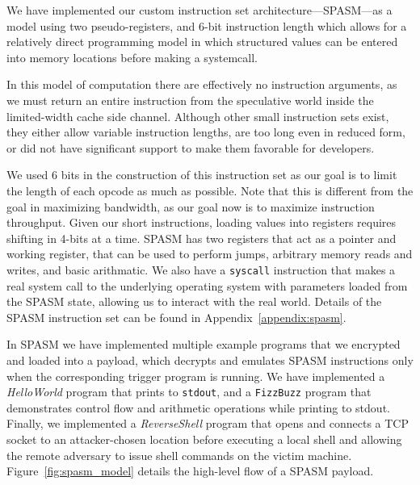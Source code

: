 We have implemented our custom instruction set architecture---SPASM---as a model
using two pseudo-registers, and
6-bit instruction length which allows for a relatively direct programming model
in which structured values can be entered into memory locations before making
a systemcall.


%

In this model of computation there are effectively no instruction arguments, as we must
return an entire instruction from the speculative world inside the limited-width
cache side channel. Although other small
instruction sets exist, they either allow variable instruction
lengths, are too long even in reduced form, or did not have significant support
to make them favorable for developers.

We used 6 bits in the construction of this instruction set as our
goal is to limit the length of each opcode as much as possible. Note that this
is different from the goal in maximizing bandwidth, as our goal now is to
maximize instruction throughput. Given our short instructions, loading values into registers
requires shifting in 4-bits at a time. SPASM has two registers that act as a
pointer and working register, that can be used to perform jumps, arbitrary
memory reads and writes, and basic arithmatic. We also have a \texttt{syscall}
instruction that makes a real system call to the underlying operating system
with parameters loaded from the SPASM state, allowing us to interact with the
real world. Details of
the SPASM instruction set can be found in Appendix~\ref{appendix:spasm}. 

In SPASM we have implemented multiple example programs that we encrypted and
loaded into a \speculake payload, which decrypts and emulates SPASM instructions
only when the corresponding trigger program is running.
We have implemented a \textit{HelloWorld}
program that prints to \texttt{stdout}, and a \texttt{FizzBuzz} program that
demonstrates control flow and arithmetic operations while printing to stdout.
Finally, we implemented a \textit{ReverseShell} program that opens and connects a TCP socket
to an attacker-chosen location
before executing a local shell and allowing the remote adversary
to issue shell commands on the victim machine.
Figure~\ref{fig:spasm_model} details the high-level flow of a SPASM payload.

